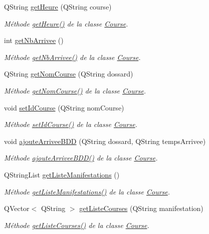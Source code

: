 \begin{DoxyCompactItemize}
Q\+String \hyperlink{class_course_afc21f8195edd50c9fd266cff0c401b7c}{get\+Heure} (Q\+String course)
\begin{DoxyCompactList}\small\item\em Méthode \hyperlink{class_course_afc21f8195edd50c9fd266cff0c401b7c}{get\+Heure()} de la classe \hyperlink{class_course}{Course}. \end{DoxyCompactList}\item 
int \hyperlink{class_course_ad8dd87e7f299bc938f40423f28c837e8}{get\+Nb\+Arrivee} ()
\begin{DoxyCompactList}\small\item\em Méthode \hyperlink{class_course_ad8dd87e7f299bc938f40423f28c837e8}{get\+Nb\+Arrivee()} de la classe \hyperlink{class_course}{Course}. \end{DoxyCompactList}\item 
Q\+String \hyperlink{class_course_a7b4485a0b38bc3b908131962b705d880}{get\+Nom\+Course} (Q\+String dossard)
\begin{DoxyCompactList}\small\item\em Méthode \hyperlink{class_course_a7b4485a0b38bc3b908131962b705d880}{get\+Nom\+Course()} de la classe \hyperlink{class_course}{Course}. \end{DoxyCompactList}\item 
void \hyperlink{class_course_a36cf16c971841431947b6fbe2b3f3d27}{set\+Id\+Course} (Q\+String nom\+Course)
\begin{DoxyCompactList}\small\item\em Méthode \hyperlink{class_course_a36cf16c971841431947b6fbe2b3f3d27}{set\+Id\+Course()} de la classe \hyperlink{class_course}{Course}. \end{DoxyCompactList}\item 
void \hyperlink{class_course_ac99042bf8b20e8d3a54e72c8a80f7ee7}{ajoute\+Arrivee\+B\+DD} (Q\+String dossard, Q\+String temps\+Arrivee)
\begin{DoxyCompactList}\small\item\em Méthode \hyperlink{class_course_ac99042bf8b20e8d3a54e72c8a80f7ee7}{ajoute\+Arrivee\+B\+D\+D()} de la classe \hyperlink{class_course}{Course}. \end{DoxyCompactList}\item 
Q\+String\+List \hyperlink{class_course_a0d995ef72152208e02eb3b10315dfabb}{get\+Liste\+Manifestations} ()
\begin{DoxyCompactList}\small\item\em Méthode \hyperlink{class_course_a0d995ef72152208e02eb3b10315dfabb}{get\+Liste\+Manifestations()} de la classe \hyperlink{class_course}{Course}. \end{DoxyCompactList}\item 
Q\+Vector$<$ Q\+String $>$ \hyperlink{class_course_ae5e74946d973166ad3000e38600acf20}{get\+Liste\+Courses} (Q\+String manifestation)
\begin{DoxyCompactList}\small\item\em Méthode \hyperlink{class_course_ae5e74946d973166ad3000e38600acf20}{get\+Liste\+Courses()} de la classe \hyperlink{class_course}{Course}. \end{DoxyCompactList}\end{DoxyCompactItemize}
